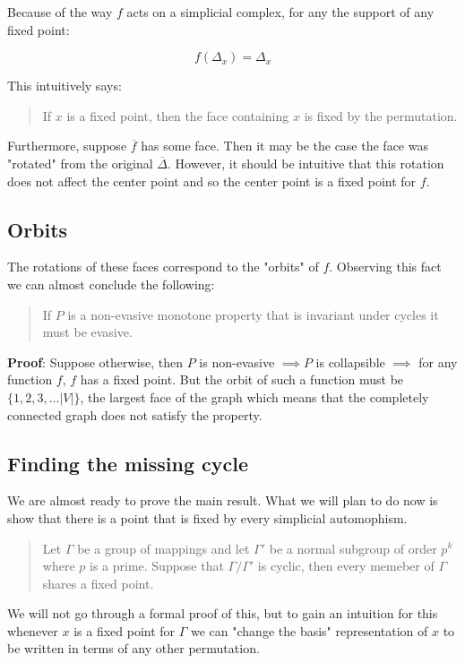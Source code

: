 \documentclass[a4paper]{article}
\newcommand{\ol}{\overline}
\begin{document}
Because of the way $f$ acts on a simplicial complex, for any the support of any fixed point:

$$f(\Delta_{x}) = \Delta_x$$

This intuitively says:

\begin{quote}
    If $x$ is a fixed point, then the face containing $x$ is fixed by the permutation.
\end{quote}

Furthermore, suppose $\ol{f}$ has some face. Then it may be the case the face was "rotated" from the original $\ol{\Delta}$. However, it should be intuitive that this rotation does not affect the center point and so the center point is a fixed point for $f$.

\subsection{Orbits}

The rotations of these faces correspond to the "orbits" of $f$. Observing this fact we can almost conclude the following:

\begin{quote}
    If $P$ is a non-evasive monotone property that is invariant under cycles it must be evasive.
\end{quote}

\textbf{Proof}: Suppose otherwise, then $P$ is non-evasive $\implies P$ is collapsible $\implies$ for any function $f$, $f$ has a fixed point. But the orbit of such a function must be $\{1, 2, 3, \ldots |V| \}$, the largest face of the graph which means that the completely connected graph does not satisfy the property.

\subsection{Finding the missing cycle}

We are almost ready to prove the main result. What we will plan to do now is show that there is a point that is fixed by every simplicial automophism.

\begin{quote}
    Let $\Gamma$ be a group of mappings and let $\Gamma'$ be a normal subgroup of order $p^k$ where $p$ is a prime. Suppose that $\Gamma/\Gamma'$ is cyclic, then every memeber of $\Gamma$ shares a fixed point.
\end{quote}

We will not go through a formal proof of this, but to gain an intuition for this whenever $x$ is a fixed point for $\Gamma$ we can "change the basis" representation of $x$ to be written in terms of any other permutation.
\end{document}
